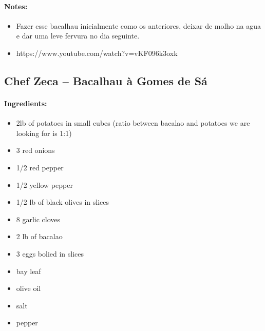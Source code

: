 \documentclass{article}
\begin{document}
\paragraph{Notes:}
\begin{itemize}
    \item Fazer esse bacalhau inicialmente como os anteriores, deixar de molho na agua e dar uma leve fervura no dia seguinte.
    \item https://www.youtube.com/watch?v=vKF096k3oxk
\end{itemize}

\subsection{Chef Zeca – Bacalhau à Gomes de Sá}

\paragraph{Ingredients:}
\begin{itemize}
    \item 2lb of potatoes in small cubes (ratio between bacalao and potatoes we are looking for is 1:1)
    \item 3 red onions
    \item 1/2 red pepper
    \item 1/2 yellow pepper
    \item 1/2 lb of black olives in slices
    \item 8 garlic cloves
    \item 2 lb of bacalao
    \item 3 eggs bolied in slices
    \item bay leaf
    \item olive oil
    \item salt
    \item pepper
\end{itemize}
\end{document}
